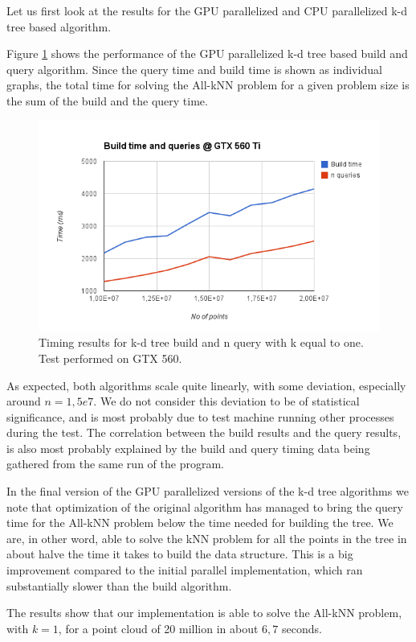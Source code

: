 Let us first look at the results for the GPU parallelized and CPU parallelized k-d tree based algorithm.

Figure \ref{fig:v17-gtx-560} shows the performance of the GPU parallelized k-d tree based build and query algorithm. Since the query time and build time is shown as individual graphs, the total time for solving the All-kNN problem for a given problem size is the sum of the build and the query time.

\begin{figure}[ht!]
    \centering
    \includegraphics[width=120mm]{../gfx/v17-gtx-560.png}
    \caption{Timing results for k-d tree build and n query with k equal to one. Test performed on GTX 560.}
    \label{fig:v17-gtx-560}
\end{figure}

As expected, both algorithms scale quite linearly, with some deviation, especially around $n=1,5e7$. We do not consider this deviation to be of statistical significance, and is most probably due to test machine running other processes during the test. The correlation between the build results and the query results, is also most probably explained by the build and query timing data being gathered from the same run of the program.

In the final version of the GPU parallelized versions of the k-d tree algorithms we note that optimization of the original algorithm has managed to bring the query time for the All-kNN problem below the time needed for building the tree. We are, in other word, able to solve the kNN problem for all the points in the tree in about halve the time it takes to build the data structure. This is a big improvement compared to the initial parallel implementation, which ran substantially slower than the build algorithm.

The results show that our implementation is able to solve the All-kNN problem, with $k=1$, for a point cloud of 20 million in about $6,7$ seconds.

